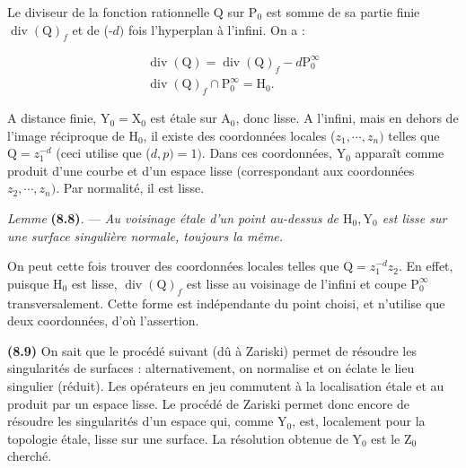 \documentclass[10pt,leqno]{article}
\begin{document}
\noindent Le diviseur de la fonction rationnelle \(\mathrm{Q}\) sur \(\mathrm{P}_{0}\) est somme de sa partie finie \(\operatorname{div}(\mathrm{Q})_{f}\) et de (-\(d)\) fois l'hyperplan à l'infini. On a :\par

\begin{equation*}\begin{gathered}\operatorname{div}(\mathrm{Q}) = \operatorname{div}(\mathrm{Q})_{f} - d\mathrm{P}_{0}^{\infty } \\ \operatorname{div}(\mathrm{Q})_{f} \cap  \mathrm{P}_{0}^{\infty } = \mathrm{H}_{0}.\end{gathered}\tag{8.7.1}\end{equation*}

\noindent \(\mathrm{A}\) distance finie, \(\mathrm{Y}_{0} = \mathrm{X}_{0}\) est étale sur \(\mathrm{A}_{0}\), donc lisse. \(\mathrm{A}\) l'infini, mais en dehors de l'image réciproque de \(\mathrm{H}_{0}\), il existe des coordonnées locales (\(z_{1},\cdots ,z_{n})\) telles que \(\mathrm{Q} = z_{1}^{-d}\) (ceci utilise que (\(d,p) = 1)\). Dans ces coordonnées, \(\mathrm{Y}_{0}\) apparaît comme produit d'une courbe et d'un espace lisse (correspondant aux coordonnées \(z_{2},\cdots ,z_{n})\). Par normalité, il est lisse.\par

\noindent \emph{Lemme} \textbf{(8.8)}. — {\itshape Au voisinage étale d'un point au-dessus de \(\mathrm{H}_{0}, \mathrm{Y}_{0}\) est lisse sur une surface singulière normale, toujours la même.}\par

\noindent On peut cette fois trouver des coordonnées locales telles que \(\mathrm{Q} = z_{1}^{-d}z_{2}\). En effet, puisque \(\mathrm{H}_{0}\) est lisse, \(\operatorname{div}(\mathrm{Q})_{f}\) est lisse au voisinage de l'infini et coupe \(\mathrm{P}_{0}^{\infty }\) transversalement. Cette forme est indépendante du point choisi, et n'utilise que deux coordonnées, d'où l'assertion.\par

\noindent \textbf{(8.9)} On sait que le procédé suivant (dû à Zariski) permet de résoudre les singularités de surfaces : alternativement, on normalise et on éclate le lieu singulier (réduit). Les opérateurs en jeu commutent à la localisation étale et au produit par un espace lisse. Le procédé de Zariski permet donc encore de résoudre les singularités d'un espace qui, comme \(\mathrm{Y}_{0}\), est, localement pour la topologie étale, lisse sur une surface. La résolution obtenue de \(\mathrm{Y}_{0}\) est le \(\mathrm{Z}_{0}\) cherché.\par
\end{document}
